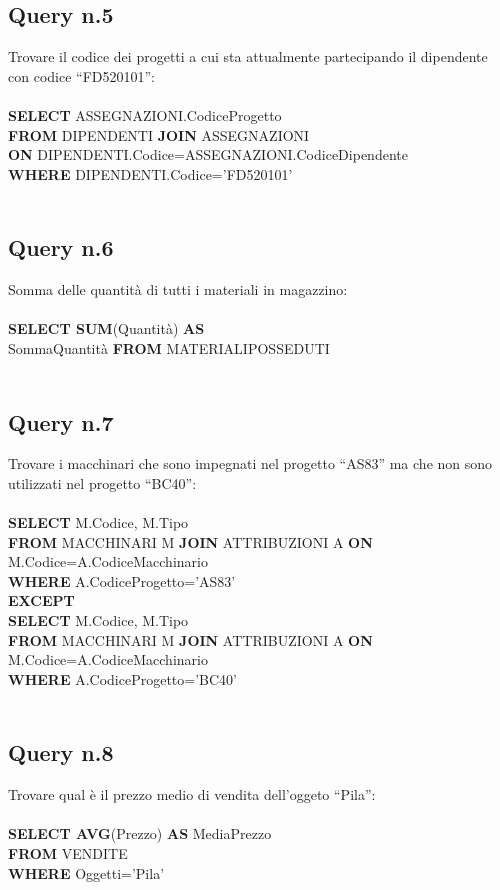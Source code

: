 \documentclass[a4paper,12pt,italian]{article}
\begin{document}
\subsection*{Query n.5}
Trovare il codice dei progetti a cui sta attualmente partecipando il dipendente con codice “FD520101”: \\ \\
\textbf{SELECT} ASSEGNAZIONI.CodiceProgetto \\
\textbf{FROM} DIPENDENTI \textbf{JOIN} ASSEGNAZIONI \\ \textbf{ON} DIPENDENTI.Codice=ASSEGNAZIONI.CodiceDipendente \\
\textbf{WHERE} DIPENDENTI.Codice=’FD520101’ \\ \\

\subsection*{Query n.6}
Somma delle quantità di tutti i materiali in magazzino: \\ \\
\textbf{SELECT SUM}(Quantità) \textbf{AS} \\ SommaQuantità
\textbf{FROM} MATERIALIPOSSEDUTI \\ \\

\subsection*{Query n.7}
Trovare i macchinari che sono impegnati nel progetto “AS83” ma che non sono utilizzati nel progetto “BC40”: \\ \\
\textbf{SELECT} M.Codice, M.Tipo \\
\textbf{FROM} MACCHINARI M \textbf{JOIN} ATTRIBUZIONI A \textbf{ON} M.Codice=A.CodiceMacchinario \\
\textbf{WHERE} A.CodiceProgetto=’AS83’ \\ 
\textbf{EXCEPT} \\
\textbf{SELECT} M.Codice, M.Tipo \\
\textbf{FROM} MACCHINARI M \textbf{JOIN} ATTRIBUZIONI A \textbf{ON} M.Codice=A.CodiceMacchinario \\
\textbf{WHERE} A.CodiceProgetto=’BC40’ \\ \\

\subsection*{Query n.8}
Trovare qual è il prezzo medio di vendita dell’oggeto “Pila”: \\ \\
\textbf{SELECT AVG}(Prezzo) \textbf{AS} MediaPrezzo \\
\textbf{FROM} VENDITE \\
\textbf{WHERE} Oggetti=’Pila’ \\ \\
\end{document}
